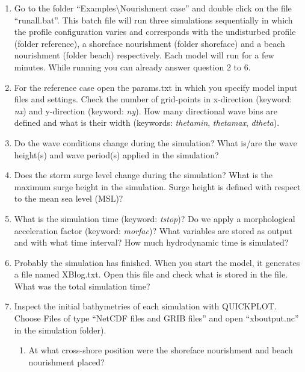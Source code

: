 \documentclass{article}
\begin{document}
\begin{enumerate}
\item  Go to the folder ``Examples\textbackslash Nourishment case'' and double click on the file ``runall.bat''. This batch file will run three simulations sequentially in which the profile configuration varies and corresponds with the undisturbed profile (folder reference), a shoreface nourishment (folder shoreface) and a beach nourishment (folder beach) respectively. Each model will run for a few minutes. While running you can already answer question 2 to 6.

\item  For the reference case open the params.txt in which you specify model input files and settings. Check the number of grid-points in x-direction (keyword: \textit{nx}) and y-direction (keyword: \textit{ny}). How many directional wave bins are defined and what is their width (keywords: \textit{thetamin}, \textit{thetamax}, \textit{dtheta}).

\item  Do the wave conditions change during the simulation? What is/are the wave height(s) and wave period(s) applied in the simulation?

\item  Does the storm surge level change during the simulation? What is the maximum surge height in the simulation. Surge height is defined with respect to the mean sea level (MSL)?

\item  What is the simulation time (keyword: \textit{tstop})? Do we apply a morphological acceleration factor (keyword: \textit{morfac})? What variables are stored as output and with what time interval? How much hydrodynamic time is simulated?

\item  Probably the simulation has finished. When you start the model, it generates a file named XBlog.txt. Open this file and check what is stored in the file. What was the total simulation time?

\item  Inspect the initial bathymetries of each simulation with QUICKPLOT. Choose Files of type ``NetCDF files and GRIB files'' and open ``xboutput.nc'' in the simulation folder). 

\begin{enumerate}
\item  At what cross-shore position were the shoreface nourishment and beach nourishment placed? 


\end{enumerate}
\end{enumerate}
\end{document}
